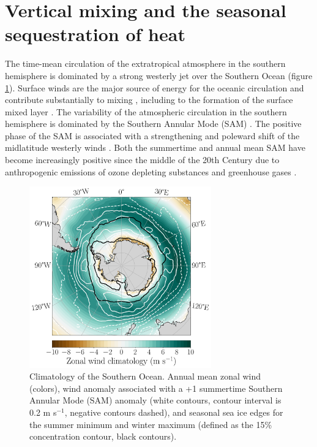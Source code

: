 \documentclass{ametsocV5}
\begin{document}


\section{Vertical mixing and the seasonal sequestration of heat} %
\label{sec:subsurface_heat_sequestration}

The time-mean circulation of the extratropical atmosphere in the southern hemisphere is dominated by a strong westerly jet over the Southern Ocean (figure \ref{fig:zonal_wind_clim}). Surface winds are the major source of energy for the oceanic circulation \citep{Wunsch1998} and contribute substantially to mixing \citep{Munk1998}, including to the formation of the surface mixed layer \citep{Pollard1972,Wunsch2004}. The variability of the atmospheric circulation in the southern hemisphere is dominated by the Southern Annular Mode (SAM) \citep{Gong1999,Thompson2000}. The positive phase of the SAM is associated with a strengthening and poleward shift of the midlatitude westerly winds \citep{Thompson2000}. Both the summertime and annual mean SAM have become increasingly positive since the middle of the 20th Century \citep{Jones2016,Marshall2003a} due to anthropogenic emissions of ozone depleting substances and greenhouse gases \citep[see e.g.][]{Polvani2011,Swart2012,Thompson2011a}.


\begin{figure}[!ht]
    \begin{center}
        \includegraphics[width=0.7\textwidth]{figures/zonal_wind_clim.pdf}
        \caption{Climatology of the Southern Ocean. Annual mean zonal wind (colors), wind anomaly associated with a +1 summertime Southern Annular Mode (SAM) anomaly (white contours, contour interval is 0.2 m s$^{-1}$, negative contours dashed), and seasonal sea ice edges for the summer minimum and winter maximum (defined as the 15\% concentration contour, black contours).}
        \label{fig:zonal_wind_clim}
    \end{center}
\end{figure}
\end{document}
